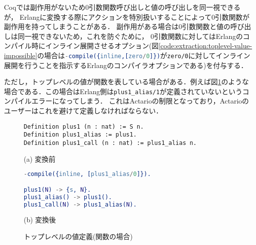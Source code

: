 Coqでは副作用がないため0引数関数呼び出しと値の呼び出しを同一視できるが，
Erlangに変換する際にアクションを特別扱いすることによって0引数関数が副作用を持ってしまうことがある．
副作用がある場合は0引数関数と値の呼び出しは同一視できないため，これを防ぐために，
0引数関数に対してはErlangのコンパイル時にインライン展開させるオプション(図\ref{code:extraction:toplevel-value-impossible}の場合は\lstinline[language=Erlang]|-compile({inline,[zero/0]})|が\lstinline{zero/0}に対してインライン展開を行うことを指示するErlangのコンパイラオプションである)を付与する．

ただし，トップレベルの値が関数を表している場合がある．例えば図\ref{code:extraction:toplevel-value-func}のような場合である．この場合はErlang側は\lstinline{plus1_alias/1}が定義されていないというコンパイルエラーになってしまう．
これはActarioの制限となっており，Actarioのユーザーはこれを避けて定義しなければならない．


\begin{figure}\centering
\begin{minipage}{1\textwidth}\centering
\begin{lstlisting}[frame=single,numbers=none,xleftmargin=0pt]
Definition plus1 (n : nat) := S n.
Definition plus1_alias := plus1.
Definition plus1_call (n : nat) := plus1_alias n.
\end{lstlisting}
(a) 変換前
\end{minipage}
\begin{minipage}{1\textwidth}\centering
\begin{lstlisting}[frame=single,numbers=none,xleftmargin=0pt,language=Erlang]
-compile({inline, [plus1_alias/0]}).

plus1(N) -> {s, N}.
plus1_alias() -> plus1().
plus1_call(N) -> plus1_alias(N).
\end{lstlisting}
(b) 変換後
\end{minipage}
\label{code:extraction:toplevel-value-func}
\caption{トップレベルの値定義(関数の場合)}
\end{figure}
